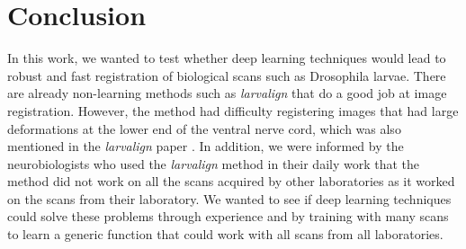 \documentclass{book}
\begin{document}
	
	\chapter{Conclusion}
	In this work, we wanted to test whether deep learning techniques would lead to robust and fast registration of biological scans such as Drosophila larvae. There are already non-learning methods such as \textit{larvalign} \cite{larvalign} that do a good job at image registration. However, the method had difficulty registering images that had large deformations at the lower end of the ventral nerve cord, which was also mentioned in the \textit{larvalign} paper \cite{larvalign}. In addition, we were informed by the neurobiologists who used the \textit{larvalign} method in their daily work that the method did not work on all the scans acquired by other laboratories as it worked on the scans from their laboratory. We wanted to see if deep learning techniques could solve these problems through experience and by training with many scans to learn a generic function that could work with all scans from all laboratories.
\end{document}

